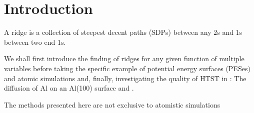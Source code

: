 \section{Introduction}
\label{sec:erm-introduction}

A ridge is a collection of steepest decent paths (SDPs) between any \sap2s and \sap1s between two end \sap1s.

We shall first introduce the finding of ridges for any given function of multiple variables before taking the specific example of potential energy surfaces (PESes) and atomic simulations and,
finally, investigating the quality of HTST in :
The diffusion of Al on an Al(100) surface and .

\bit
\item The methods presented here are not exclusive to atomistic simulations
\eit

\incomplete
